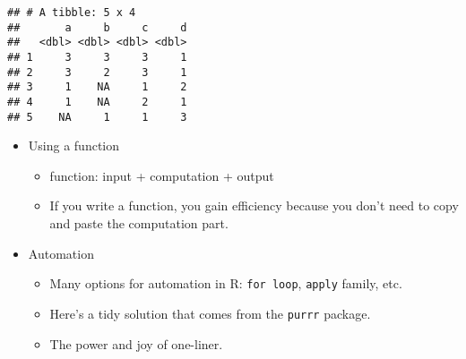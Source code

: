\documentclass[
]{book}
\newenvironment{Shaded}{\begin{snugshade}}{\end{snugshade}}
\newcommand{\CommentTok}[1]{\textcolor[rgb]{0.56,0.35,0.01}{\textit{#1}}}
\newcommand{\ControlFlowTok}[1]{\textcolor[rgb]{0.13,0.29,0.53}{\textbf{#1}}}
\newcommand{\DecValTok}[1]{\textcolor[rgb]{0.00,0.00,0.81}{#1}}
\newcommand{\KeywordTok}[1]{\textcolor[rgb]{0.13,0.29,0.53}{\textbf{#1}}}
\newcommand{\NormalTok}[1]{#1}
\newcommand{\OperatorTok}[1]{\textcolor[rgb]{0.81,0.36,0.00}{\textbf{#1}}}
\newcommand{\OtherTok}[1]{\textcolor[rgb]{0.56,0.35,0.01}{#1}}
\newcommand{\StringTok}[1]{\textcolor[rgb]{0.31,0.60,0.02}{#1}}
\providecommand{\tightlist}{%
  \setlength{\itemsep}{0pt}\setlength{\parskip}{0pt}}
\begin{document}
\begin{verbatim}
## # A tibble: 5 x 4
##       a     b     c     d
##   <dbl> <dbl> <dbl> <dbl>
## 1     3     3     3     1
## 2     3     2     3     1
## 3     1    NA     1     2
## 4     1    NA     2     1
## 5    NA     1     1     3
\end{verbatim}

\begin{itemize}
\tightlist
\item
  Using a function

  \begin{itemize}
  \tightlist
  \item
    function: input + computation + output
  \item
    If you write a function, you gain efficiency because you don't need to copy and paste the computation part.
  \end{itemize}
\end{itemize}

\begin{Shaded}
\end{Shaded}

\begin{itemize}
\tightlist
\item
  Automation

  \begin{itemize}
  \tightlist
  \item
    Many options for automation in R: \texttt{for\ loop}, \texttt{apply} family, etc.
  \item
    Here's a tidy solution that comes from the \texttt{purrr} package.
  \item
    The power and joy of one-liner.
  \end{itemize}
\end{itemize}
\end{document}
